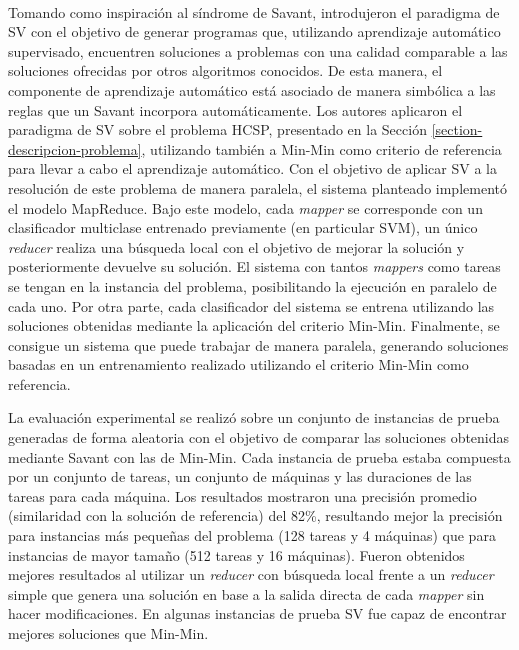 \paragraph{}Tomando como inspiración al síndrome de Savant, \citet{savant-original} introdujeron el paradigma de SV con el objetivo de generar programas que, utilizando aprendizaje automático supervisado, encuentren soluciones a problemas con una calidad comparable a las soluciones ofrecidas por otros algoritmos conocidos.
De esta manera, el componente de aprendizaje automático está asociado de manera simbólica a las reglas que un Savant incorpora automáticamente.
Los autores aplicaron el paradigma de SV sobre el problema HCSP, presentado en la Sección \ref{section-descripcion-problema}, utilizando también a Min-Min como criterio de referencia para llevar a cabo el aprendizaje automático.
Con el objetivo de aplicar SV a la resolución de este problema de manera paralela, el sistema planteado implementó el modelo MapReduce.
Bajo este modelo, cada \textit{mapper} se corresponde con un clasificador multiclase entrenado previamente (en particular SVM), un único \textit{reducer} realiza una búsqueda local con el objetivo de mejorar la solución y posteriormente devuelve su solución.
El sistema con tantos \textit{mappers} como tareas se tengan en la instancia del problema, posibilitando la ejecución en paralelo de cada uno.
Por otra parte, cada clasificador del sistema se entrena utilizando las soluciones obtenidas mediante la aplicación del criterio Min-Min.
Finalmente, se consigue un sistema que puede trabajar de manera paralela, generando soluciones basadas en un entrenamiento realizado utilizando el criterio Min-Min como referencia. 

La evaluación experimental se realizó sobre un conjunto de instancias de prueba generadas de forma aleatoria con el objetivo de comparar las soluciones obtenidas mediante Savant con las de Min-Min.
Cada instancia de prueba estaba compuesta por un conjunto de tareas, un conjunto de máquinas y las duraciones de las tareas para cada máquina. 
Los resultados mostraron una precisión promedio (similaridad con la solución de referencia) del 82\%, resultando mejor la precisión para instancias más pequeñas del problema (128 tareas y 4 máquinas) que para instancias de mayor tamaño (512 tareas y 16 máquinas). 
Fueron obtenidos mejores resultados al utilizar un \textit{reducer} con búsqueda local frente a un \textit{reducer} simple que genera una solución en base a la salida directa de cada \textit{mapper} sin hacer modificaciones.
En algunas instancias de prueba SV fue capaz de encontrar mejores soluciones que Min-Min. 

